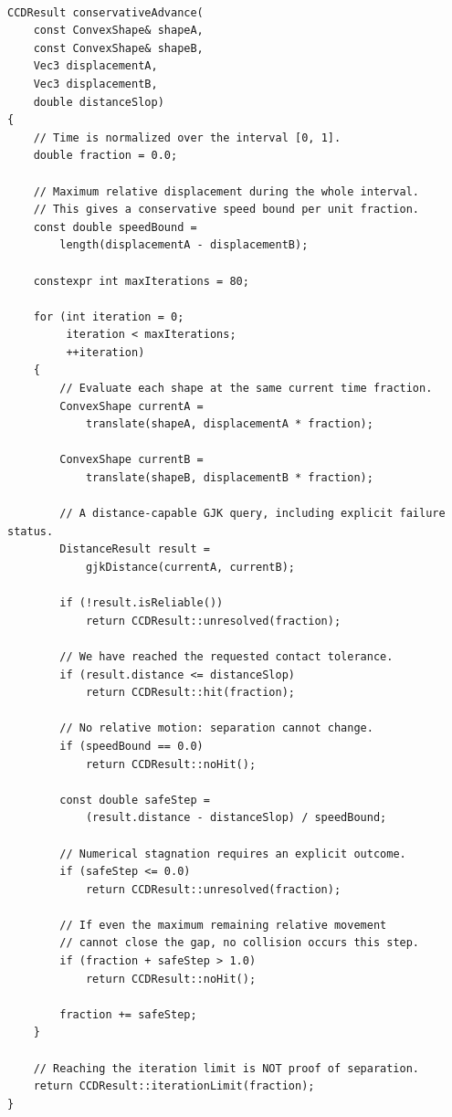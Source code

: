 \begin{verbatim}

CCDResult conservativeAdvance(
    const ConvexShape& shapeA,
    const ConvexShape& shapeB,
    Vec3 displacementA,
    Vec3 displacementB,
    double distanceSlop)
{
    // Time is normalized over the interval [0, 1].
    double fraction = 0.0;

    // Maximum relative displacement during the whole interval.
    // This gives a conservative speed bound per unit fraction.
    const double speedBound =
        length(displacementA - displacementB);

    constexpr int maxIterations = 80;

    for (int iteration = 0;
         iteration < maxIterations;
         ++iteration)
    {
        // Evaluate each shape at the same current time fraction.
        ConvexShape currentA =
            translate(shapeA, displacementA * fraction);

        ConvexShape currentB =
            translate(shapeB, displacementB * fraction);

        // A distance-capable GJK query, including explicit failure status.
        DistanceResult result =
            gjkDistance(currentA, currentB);

        if (!result.isReliable())
            return CCDResult::unresolved(fraction);

        // We have reached the requested contact tolerance.
        if (result.distance <= distanceSlop)
            return CCDResult::hit(fraction);

        // No relative motion: separation cannot change.
        if (speedBound == 0.0)
            return CCDResult::noHit();

        const double safeStep =
            (result.distance - distanceSlop) / speedBound;

        // Numerical stagnation requires an explicit outcome.
        if (safeStep <= 0.0)
            return CCDResult::unresolved(fraction);

        // If even the maximum remaining relative movement
        // cannot close the gap, no collision occurs this step.
        if (fraction + safeStep > 1.0)
            return CCDResult::noHit();

        fraction += safeStep;
    }

    // Reaching the iteration limit is NOT proof of separation.
    return CCDResult::iterationLimit(fraction);
}
\end{verbatim}

